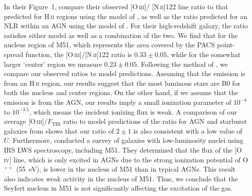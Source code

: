 In their Figure~1, \citet{2011ApJ...740L..29F} compare their observed [O\,\textsc{iii}]/ [N\,\textsc{ii}]122 line ratio to that predicted for H\,\textsc{ii} regions using the model of \citet{1985ApJS...57..349R}, as well as the ratio predicted for an NLR within an AGN using the model of \citet{2004ApJS..153....9G}. For their high-redshift galaxy, the ratio satisfies either model as well as a combination of the two.  We find that for the nucleus region of M51, which represents the area covered by the PACS point-spread function, the [O\,\textsc{iii}]/[N\,\textsc{ii}]122 ratio is $0.33 \pm 0.05$, while for the somewhat larger `center' region we measure $0.23 \pm 0.05$.  Following the method of \citet{2011ApJ...740L..29F}, we compare our observed ratios to model predictions.  Assuming that the emission is from an H\,\textsc{ii} region, our results suggest that the most luminous stars are B0 \citep{1996ApJ...460..914V} for both the nucleus and center regions.  On the other hand, if we assume that the emission is from the AGN, our results imply a small ionization parameter of $10^{-4}$ to $10^{-3.5}$, which means the incident ionizing flux is weak.  A comparison of our average [O\,\textsc{iii}]/$F_{\mathrm{TIR}}$ ratio to model predictions of the ratio for AGN and starburst galaxies from \citet{2009ApJ...701.1147A} shows that our ratio of $2\pm1$ is also consistent with a low value of $U$.  Furthermore, \citet{2004A&A...414..825S} conducted a survey of galaxies with low-luminosity nuclei using IRS LWS spectroscopy, including M51. They determined that the flux of the [O\,\textsc{iv}] line, which is only excited in AGNs due to the strong ionization potential of O$^{++}$ (55~eV), is lower in the nucleus of M51 than in typical AGNs.  This result also indicates weak activity in the nucleus of M51. Thus, we conclude that the Seyfert nucleus in M51 is not significantly affecting the excitation of the gas.


